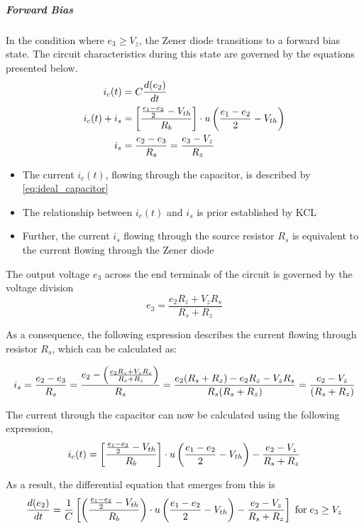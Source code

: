 \subparagraph{Forward Bias}
In the condition where $e_3 \geq V_z$, the Zener diode transitions to a forward bias state. The circuit characteristics during this state are governed by the equations presented below.
\begin{align}
    i_c(t) &= C\frac{d(e_2)}{dt}\\
    i_c(t) + i_s &= \left[\frac{\frac{e_1 - e_2}{2} - V_{th}}{R_b} \right]\cdot u\left(\frac{e_1 - e_2}{2} - V_{th} \right)\\
    i_s &= \frac{e_2-e_3}{R_s}=\frac{e_3-V_z}{R_z}
\end{align}
\begin{itemize}
	\item The current $i_c(t)$, flowing through the capacitor, is described by \eqref{eq:ideal_capacitor}
	\item The relationship between $i_c(t)$ and $i_s$ is prior established by KCL
	\item Further, the current $i_s$ flowing through the source resistor $R_s$ is equivalent to the current flowing through the Zener diode
\end{itemize}

The output voltage $e_3$ across the end terminals of the circuit is governed by the voltage division
\begin{equation}
    e_3=\frac{e_2R_z+V_zR_s}{R_s+R_z}
    \label{eq:noLoad_e3}
\end{equation}

As a consequence, the following expression describes the current flowing through resistor $R_s$, which can be calculated as:

\begin{equation}
    i_s=\frac{e_2-e_3}{R_s}=\frac{e_2-\left(\frac{e_2R_z+V_zR_s}{R_s+R_z} \right)}{R_s}=\frac{e_2(R_s+R_z)-e_2R_z-V_zR_s}{R_s(R_s+R_z)}=\frac{e_2-V_z}{(R_s+R_z)}
\end{equation}

The current through the capacitor can now be calculated using the following expression,
\begin{equation}
    i_c(t) = \left[\frac{\frac{e_1 - e_2}{2} - V_{th}}{R_b} \right]\cdot u\left(\frac{e_1 - e_2}{2} - V_{th} \right)-\frac{e_2-V_z}{R_s+R_z}
\end{equation}

As a result, the differential equation that emerges from this is
\begin{equation}
    \frac{d(e_2)}{dt}=\frac{1}{C}\left[\left(\frac{\frac{e_1 - e_2}{2} - V_{th}}{R_b} \right)\cdot u\left(\frac{e_1 - e_2}{2} - V_{th} \right)-\frac{e_2-V_z}{R_s+R_z} \right] \hspace{0.1cm} \text{for} \hspace{0.1cm} e_3 \geq V_z
    \label{eq:noLoad_diffEq2}
\end{equation}

